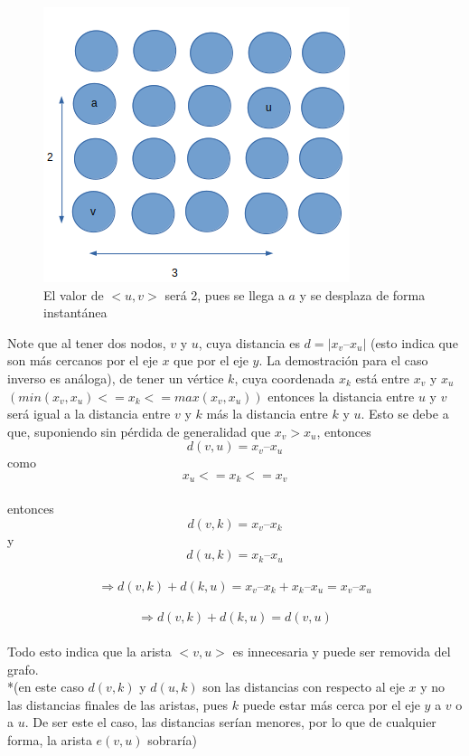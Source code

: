 \documentclass[a4paper,12pt,twocolumn]{article}
\begin{document}
		\begin{figure}[h!]
			\centering
			\includegraphics[width=0.9\linewidth]{"figura 2"}
			\caption{El valor de $<u,v>$ será 2, pues se llega a $a$ y se desplaza de forma instantánea}
			\label{fig:figura-2}
		\end{figure}
		
		Note que al tener dos nodos, $v$ y $u$, cuya distancia es $d = |x_v – x_u|$ (esto indica que son más cercanos por el eje $x$ que por el eje $y$. La demostración para el caso inverso es análoga), de tener un vértice $k$, cuya coordenada $x_k$ está entre $x_v$ y $x_u$ $(min(x_v,x_u) <= x_k <= max(x_v, x_u))$ entonces la distancia entre $u$ y $v$ será igual a la distancia entre $v$ y $k$ más la distancia entre $k$ y $u$. Esto se debe a que, suponiendo sin pérdida de generalidad que $x_v > x_u$, entonces\\
		
			$$d(v, u) = x_v – x_u$$
		como    $$x_u <= x_k <= x_v$$\\
		entonces  $$d(v, k) = x_v – x_k$$
		y 	    $$d(u, k) = x_k – x_u$$\\
		$$\Rightarrow d(v, k) + d(k, u) = x_v – x_k + x_k – x_u = x_v – x_u $$\\
		$$\Rightarrow  d(v, k) + d(k, u) = d(v, u)$$\\
		
		Todo esto indica que la arista $<v, u>$ es innecesaria y puede ser removida del grafo.\\
		
		*(en este caso $d(v, k)$ y $d(u, k)$ son las distancias con respecto al eje $x$ y no las distancias finales de las aristas, pues $k$ puede estar más cerca por el eje $y$ a $v$ o a $u$. De ser este el caso, las distancias serían menores, por lo que de cualquier forma, la arista $e(v, u)$ sobraría)\\
		
\end{document}
